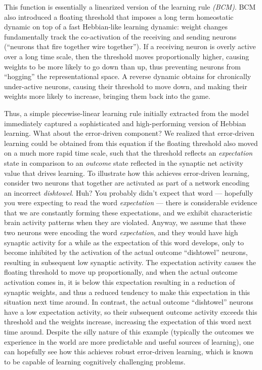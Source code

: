 \documentclass[11pt,twoside]{article}
\begin{document}
This function is essentially a linearized version of the
 learning rule {\em (BCM)}. BCM also
introduced a floating threshold that imposes a long term homeostatic dynamic
on top of a fast Hebbian-like learning dynamic: weight changes fundamentally
track the co-activation of the receiving and sending neurons (``neurons that
fire together wire together'').  If a receiving neuron is overly active over a
long time scale, then the threshold moves proportionally higher, causing
weights to be more likely to go down than up, thus preventing neurons from
``hogging'' the representational space.  A reverse dynamic obtains for
chronically under-active neurons, causing their threshold to move down, and
making their weights more likely to increase, bringing them back into the
game.

Thus, a simple piecewise-linear learning rule initially extracted from the
 model immediately captured a sophisticated
and high-performing version of Hebbian learning. What about the error-driven
component?  We realized that error-driven learning could be obtained from this
equation if the floating threshold also moved on a much more rapid time scale,
such that the threshold reflects an {\em expectation} state in comparison to
an {\em outcome} state reflected in the synaptic net activity value that
drives learning.  To illustrate how this achieves error-driven learning,
consider two neurons that together are activated as part of a network encoding
an incorrect {\em dishtowel}.  Huh?  You probably didn't expect that word ---
hopefully you were expecting to read the word {\em expectation} --- there is
considerable evidence that we are constantly forming these expectations, and
we exhibit characteristic brain activity patterns when they are violated.  Anyway, we assume that these two neurons were encoding the word
{\em expectation}, and they would have high synaptic activity for a while as
the expectation of this word develops, only to become inhibited by the
activation of the actual outcome ``dishtowel'' neurons, resulting in
subsequent low synaptic activity.  The expectation activity causes the
floating threshold to move up proportionally, and when the actual outcome
activation comes in, it is below this expectation resulting in a reduction of
synaptic weights, and thus a reduced tendency to make this expectation in this
situation next time around.  In contrast, the actual outcome ``dishtowel''
neurons have a low expectation activity, so their subsequent outcome activity
exceeds this threshold and the weights increase, increasing the expectation of
this word next time around.  Despite the silly nature of this example
(typically the outcomes we experience in the world are more predictable and
useful sources of learning), one can hopefully see how this achieves robust
error-driven learning, which is known to be capable of learning cognitively
challenging problems.
\end{document}
